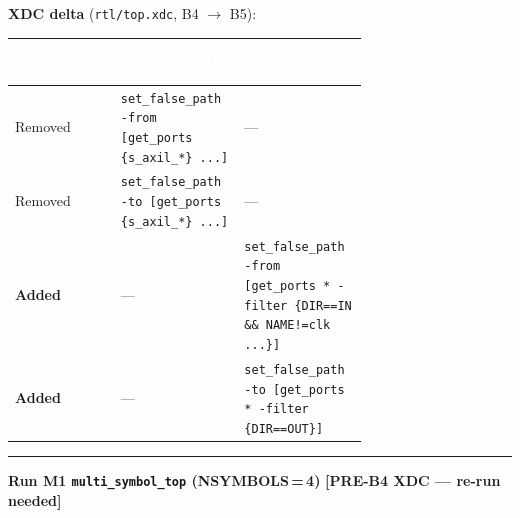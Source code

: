 \documentclass[10pt,a4paper]{article}
\newcommand{\sectionrule}{\vspace{2pt}\textcolor{rulegray}{\rule{\linewidth}{0.8pt}}\vspace{2pt}}
\begin{document}
\noindent\textbf{XDC delta} (\texttt{rtl/top.xdc}, B4 $\to$ B5):
\begin{center}
\small
\renewcommand{\arraystretch}{1.15}
\begin{tabular}{@{}l p{0.35\linewidth} p{0.35\linewidth}@{}}
\toprule
\rowcolor{hdrblue}
\textcolor{white}{\textbf{}} &
\textcolor{white}{\textbf{B4 (removed)}} &
\textcolor{white}{\textbf{B5 (replaced with)}} \\
\midrule
\rowcolor{failrowbg}
Removed &
\texttt{set\_false\_path -from [get\_ports \{s\_axil\_*\} ...]} &
--- \\
\rowcolor{failrowbg}
Removed &
\texttt{set\_false\_path -to [get\_ports \{s\_axil\_*\} ...]} &
--- \\
\rowcolor{passrowbg}
\textbf{Added} & --- &
\texttt{set\_false\_path -from [get\_ports * -filter \{DIR==IN \&\& NAME!=clk ...\}]} \\
\rowcolor{passrowbg}
\textbf{Added} & --- &
\texttt{set\_false\_path -to [get\_ports * -filter \{DIR==OUT\}]} \\
\bottomrule
\end{tabular}
\end{center}

\sectionrule

{\large\bfseries\color{hdrblue} Run M1 \textendash{} \texttt{multi\_symbol\_top} (NSYMBOLS\,=\,4)\quad}%
{\large\color{badred}\textbf{[PRE-B4 XDC — re-run needed]}}

\vspace{4pt}
\end{document}
